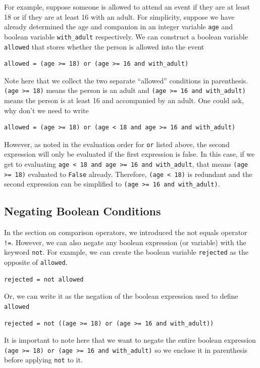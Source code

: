 \documentclass{article}
\begin{document}
For example, suppose someone is allowed to attend an event if they are at least 18 or if they are at least 16 with an adult. For simplicity, suppose we have already determined the age and companion in an integer variable \texttt{age} and boolean variable \texttt{with\_adult} respectively. We can construct a boolean variable \texttt{allowed} that stores whether the person is allowed into the event
\begin{verbatim}
allowed = (age >= 18) or (age >= 16 and with_adult)
\end{verbatim}
Note here that we collect the two separate ``allowed'' conditions in parenthesis. \texttt{(age >= 18)} means the person is an adult and \texttt{(age >= 16 and with\_adult)} means the person is at least 16 and accompanied by an adult. One could ask, why don't we need to write
\begin{verbatim}
allowed = (age >= 18) or (age < 18 and age >= 16 and with_adult)
\end{verbatim}
However, as noted in the evaluation order for \texttt{or} listed above, the second expression will only be evaluated if the first expression is false. In this case, if we get to evaluating \texttt{age < 18 and age >= 16 and with\_adult}, that means \texttt{(age >= 18)} evaluated to \texttt{False} already. Therefore, \texttt{(age < 18)} is redundant and the second expression can be simplified to \texttt{(age >= 16 and with\_adult)}.

\subsection{Negating Boolean Conditions}
In the section on comparison operators, we introduced the not equals operator \texttt{!=}. However, we can also negate any boolean expression (or variable) with the keyword \texttt{not}. For example, we can create the boolean variable \texttt{rejected} as the opposite of \texttt{allowed}.
\begin{verbatim}
rejected = not allowed
\end{verbatim}
Or, we can write it as the negation of the boolean expression used to define \texttt{allowed}
\begin{verbatim}
rejected = not ((age >= 18) or (age >= 16 and with_adult))
\end{verbatim}
It is important to note here that we want to negate the entire boolean expression \texttt{(age >= 18) or (age >= 16 and with\_adult)} so we enclose it in parenthesis before applying \texttt{not} to it.
\end{document}
